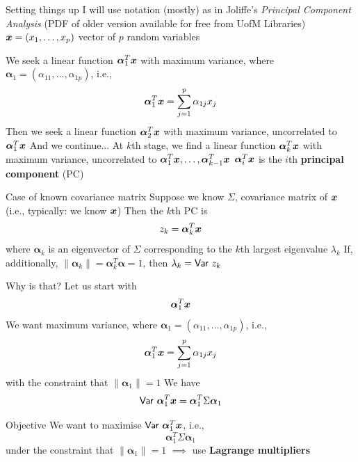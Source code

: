 \documentclass[aspectratio=169]{beamer}\usepackage[]{graphicx}\usepackage[]{xcolor}
\begin{document}


\begin{frame}{Setting things up}
I will use notation (mostly) as in Joliffe's \emph{Principal Component Analysis} (PDF of older version available for free from UofM Libraries)
\vfill
$\bm{x}=(x_1,\ldots,x_p)$ vector of $p$ random variables
\end{frame}


\begin{frame} 
We seek a linear function $\bm{\alpha}_1^T\bm{x}$ with maximum variance, where $\bm{\alpha}_1=(\alpha_{11},\ldots,\alpha_{1p})$, i.e.,
\[
\bm{\alpha}_1^T\bm{x} = \sum_{j=1}^p\alpha_{1j}x_j
\]
\vfill
Then we seek a linear function $\bm{\alpha}_2^T\bm{x}$ with maximum variance, uncorrelated to $\bm{\alpha}_1^T\bm{x}$
\vfill
And we continue...
\vfill
At $k$th stage, we find a linear function $\bm{\alpha}_k^T\bm{x}$ with maximum variance, uncorrelated to $\bm{\alpha}_1^T\bm{x},\ldots,\bm{\alpha}_{k-1}^T\bm{x}$
\vfill
$\bm{\alpha}_i^T\bm{x}$ is the $i$th \textbf{principal component} (PC)
\end{frame}

\begin{frame}{Case of known covariance matrix}
Suppose we know $\Sigma$, covariance matrix of $\bm{x}$ (i.e., typically: we know $\bm{x}$)
\vfill
Then the $k$th PC is 
\[
z_k=\bm{\alpha}_k^T\bm{x}
\]
where $\bm{\alpha}_k$ is an eigenvector of $\Sigma$ corresponding to the $k$th largest eigenvalue $\lambda_k$
\vfill
If, additionally, $\|\bm{\alpha}_k\|=\bm{\alpha}_k^T\bm{\alpha}=1$, then $\lambda_k=\mathsf{Var}\  z_k$
\end{frame}


\begin{frame}{Why is that?}
Let us start with
\[
\bm{\alpha}_1^T\bm{x}
\]
\vfill
We want maximum variance, where $\bm{\alpha}_1=(\alpha_{11},\ldots,\alpha_{1p})$, i.e.,
\[
\bm{\alpha}_1^T\bm{x} = \sum_{j=1}^p\alpha_{1j}x_j
\]
with the constraint that $\|\bm{\alpha}_1\|=1$
\vfill
We have
\[
\mathsf{Var}\  \bm{\alpha}_1^T\bm{x}
=\bm{\alpha}_1^T\Sigma\bm{\alpha}_1
\]
\end{frame}

\begin{frame}{Objective}
We want to maximise $\mathsf{Var}\  \bm{\alpha}_1^T\bm{x}$, i.e.,
\[
\bm{\alpha}_1^T\Sigma\bm{\alpha}_1
\]
under the constraint that $\|\bm{\alpha}_1\|=1$
\vfill
$\implies$ use \textbf{Lagrange multipliers}
\end{frame}
\end{document}
